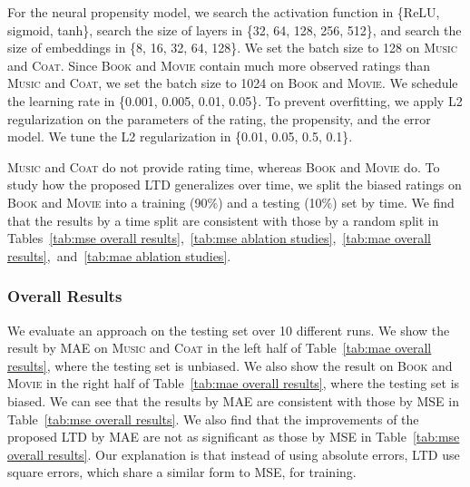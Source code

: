 \documentclass[letterpaper]{article} %
\begin{document}
For the neural propensity model, we search the activation function in \{ReLU, sigmoid, tanh\}, search the size of layers in \{32, 64, 128, 256, 512\}, and search the size of embeddings in \{8, 16, 32, 64, 128\}.
We set the batch size to 128 on \textsc{Music} and \textsc{Coat}.
Since \textsc{Book} and \textsc{Movie} contain much more observed ratings than \textsc{Music} and \textsc{Coat}, we set the batch size to 1024 on \textsc{Book} and \textsc{Movie}.
We schedule the learning rate in \{0.001, 0.005, 0.01, 0.05\}.
To prevent overfitting, we apply L2 regularization on the parameters of the rating, the propensity, and the error model.
We tune the L2 regularization in \{0.01, 0.05, 0.5, 0.1\}.

\textsc{Music} and \textsc{Coat} do not provide rating time, whereas \textsc{Book} and \textsc{Movie} do.
To study how the proposed LTD generalizes over time, we split the biased ratings on \textsc{Book} and \textsc{Movie} into a training (90\%) and a testing (10\%) set by time.
We find that the results by a time split are consistent with those by a random split in Tables~\ref{tab:mse overall results},~\ref{tab:mse ablation studies},~\ref{tab:mae overall results},~and~\ref{tab:mae ablation studies}.

\subsubsection{Overall Results}
We evaluate an approach on the testing set over 10 different runs.
We show the result by MAE on \textsc{Music} and \textsc{Coat} in the left half of Table~\ref{tab:mae overall results}, where the testing set is unbiased.
We also show the result on \textsc{Book} and \textsc{Movie} in the right half of Table~\ref{tab:mae overall results}, where the testing set is biased.
We can see that the results by MAE are consistent with those by MSE in Table~\ref{tab:mse overall results}.
We also find that the improvements of the proposed LTD by MAE are not as significant as those by MSE in Table~\ref{tab:mse overall results}.
Our explanation is that instead of using absolute errors, LTD use square errors, which share a similar form to MSE, for training.
\end{document}
